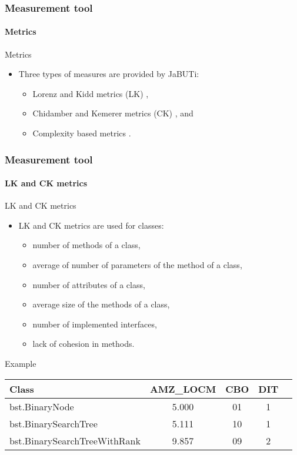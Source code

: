 \begin{frame}[parent={cmap:jabuti-measurement-tool},hasnext=true,hasprev=true]
\frametitle{Measurement tool}
\framesubtitle{Metrics}

\begin{block:fact}{Metrics}
\begin{itemize}
	\item Three types of measures are provided by JaBUTi:
	\begin{itemize}
		\item Lorenz and Kidd metrics (LK) \cite{lorenz-kidd:1994},

		\item Chidamber and Kemerer metrics (CK) \cite{chidamber-kemerer:1994},
		and

		\item Complexity based metrics \cite{mccabe:1976}.
	\end{itemize}
\end{itemize}
\end{block:fact}
\end{frame}


\begin{frame}
\frametitle{Measurement tool}
\framesubtitle{LK and CK metrics}
\label{concept:ck-metrics}
\label{concept:lk-metrics}

\begin{block:fact}{LK and CK metrics}
\begin{itemize}
	\item LK and CK metrics are used for classes:
	\begin{itemize}
		\item number of methods of a class,
		\item average of number of parameters of the method of a class,
		\item number of attributes of a class,
		\item average size of the methods of a class,
		\item number of implemented interfaces,
		\item lack of cohesion in methods.
	\end{itemize}
\end{itemize}
\end{block:fact}

\begin{block}{Example}
\small
\begin{tabular}{|l|c|c|c|c|}
\hline
\textbf{Class}					& \textbf{AMZ\_LOCM}& \textbf{CBO}	& \textbf{DIT}\\\hline
bst.BinaryNode 					& 5.000				& 01			& 1\\\hline
bst.BinarySearchTree 			& 5.111 			& 10			& 1\\\hline
bst.BinarySearchTreeWithRank	& 9.857 			& 09			& 2\\\hline
\end{tabular}
\end{block}
\end{frame}


